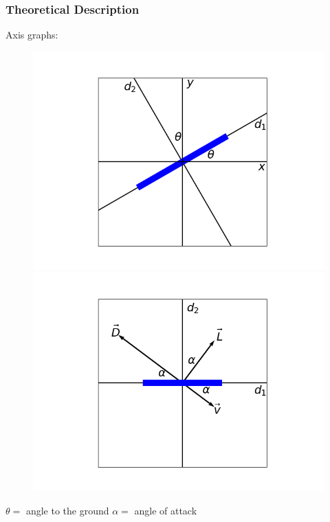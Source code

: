 \documentclass{beamer}
\begin{document}
\begin{frame}

\frametitle{Theoretical Description}

\begin{Large}
Axis graphs:
\end{Large}

\begin{figure}[H]
	\centering
	\begin{minipage}{.5\textwidth}
	  \centering
	  \includegraphics[width=\textwidth]{graf_osi.png}
	\end{minipage}%
	\begin{minipage}{.5\textwidth}
	  \centering
	  \includegraphics[width=\textwidth]{osi_frisbeeja.png}
	\end{minipage}
\end{figure}

$ \theta = $ angle to the ground \qquad \qquad $ \alpha = $ angle of attack

\end{frame}
\end{document}
